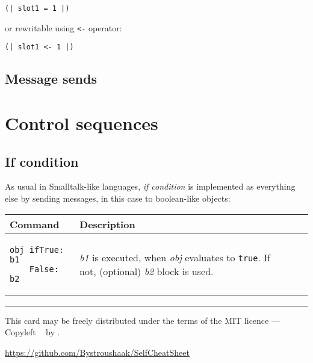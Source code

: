 \documentclass[10pt]{article}
\begin{document}
\begin{multicols*}{3}
\begin{verbatim}
(| slot1 = 1 |)
\end{verbatim}

or rewritable using \texttt{<-} operator: %
\begin{verbatim}
(| slot1 <- 1 |)
\end{verbatim}

\subsection{Message sends}





\section{Control sequences}
\subsection{If condition}

As usual in Smalltalk-like languages, \textit{if condition} is implemented as everything else by sending messages, in this case to boolean-like objects:

\vspace*{0.2cm}
\begin{tabular}{ p{70pt} p{140pt} l l }
Command & Description \\ \hline
\begin{verbatim}obj ifTrue: b1
    False: b2
\end{verbatim}
&\vspace*{0.1cm} \textit{b1} is executed, when \textit{obj} evaluates to \texttt{true}.
If not, (optional) \textit{b2} block is used. \\
\hline


\end{tabular}





\vfill \hrule\smallskip
{\small This card may be freely distributed under
the terms of the MIT licence ---
Copyleft \textcopyleft\ \thedate{} by \href{http://kitakitsune.org}{\theauthor}.

\url{https://github.com/Bystroushaak/SelfCheatSheet}
}

\end{multicols*}
\end{document}
